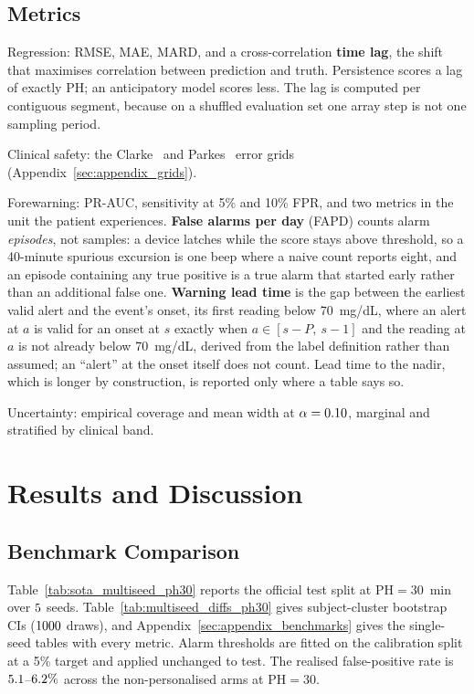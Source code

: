\documentclass[pmlr,twocolumn,10pt]{jmlr}
\newcommand{\PH}{\mathrm{PH}}
\begin{document}
\subsection{Metrics}

Regression: RMSE, MAE, MARD, and a cross-correlation \textbf{time lag}, the shift
that maximises correlation between prediction and truth. Persistence scores a lag
of exactly $\PH$; an anticipatory model scores less. The lag is computed per
contiguous segment, because on a shuffled evaluation set one array step is not one
sampling period.

Clinical safety: the Clarke~\citep{clarke1987evaluating} and
Parkes~\citep{parkes2000new} error grids
(Appendix~\ref{sec:appendix_grids}).

Forewarning: PR-AUC, sensitivity at 5\% and 10\% FPR, and two metrics in the
unit the patient experiences. \textbf{False alarms per day} (FAPD) counts alarm
\emph{episodes}, not samples: a device latches while the score stays above
threshold, so a 40-minute spurious excursion is one beep where a naive count
reports eight, and an
episode containing any true positive is a true alarm that started early rather
than an additional false one. \textbf{Warning lead time} is the gap between the
earliest valid alert and the event's onset, its first reading below 70~mg/dL,
where an alert at $a$ is valid for an onset at $s$ exactly when
$a \in [s - P,\ s - 1]$ and the reading at $a$ is not already below
70~mg/dL, derived from the label definition rather than assumed; an ``alert''
at the onset itself does not count. Lead time to the nadir, which is longer by
construction, is reported only where a table says so.

Uncertainty: empirical coverage and mean width at $\alpha = 0.10$,
marginal and stratified by clinical band.

\section{Results and Discussion}
\label{sec:results}

\subsection{Benchmark Comparison}



Table~\ref{tab:sota_multiseed_ph30} reports the official test split at
$\PH = 30$~min over $5$ seeds. Table~\ref{tab:multiseed_diffs_ph30}
gives subject-cluster bootstrap CIs ($1000$ draws), and
Appendix~\ref{sec:appendix_benchmarks} gives the single-seed tables with every
metric. Alarm thresholds are fitted on the calibration split at a 5\% target
and applied unchanged to test. The realised false-positive rate is
$5.1$--$6.2\%$ across the non-personalised arms
at $\PH = 30$.
\end{document}
